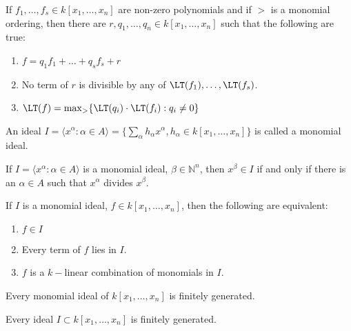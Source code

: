 \documentclass[crop=false,class=article,oneside]{standalone}
\begin{document}
        \begin{theorem}
            If $f_1,\hdots, f_s\in k[x_1,\hdots ,x_n]$ are
            non-zero polynomials and if $>$ is a monomial ordering,
            then there are $r,q_1,\hdots, q_n\in k[x_1,\hdots ,x_n]$
            such that the following are true:
            \begin{enumerate}
                \item $f=q_{1}f_{1}+\hdots+q_{s}f_{s}+r$
                \item No term of $r$ is divisible by
                      any of $\LT(f_{1}),\hdots,\LT(f_{s})$.
                \item $\LT(f)=\max_{>}\{\LT(q_{i})%
                       \cdot\LT(f_i):q_i\ne{0}\}$
            \end{enumerate}
        \end{theorem}
        \begin{definition}
            An ideal
            $I=\langle{x}^{\alpha}:\alpha\in{A}\rangle%
              =\{\sum_{\alpha}h_{\alpha}x^\alpha,h_{\alpha}%
               \in k[x_1,\hdots ,x_n]\}$
            is called a monomial ideal.
        \end{definition}
        \begin{theorem}
            If $I=\langle{x}^\alpha:\alpha\in{A}\rangle$
            is a monomial ideal,
            $\beta\in\mathbb{N}^n$, then $x^\beta\in{I}$
            if and only if there is an $\alpha\in{A}$
            such that $x^{\alpha}$ divides $x^{\beta}$.
        \end{theorem}
        \begin{theorem}
            If $I$ is a monomial ideal,
            $f\in{k}[x_1,\hdots ,x_n]$,
            then the following are equivalent:
            \begin{enumerate}
                \item $f\in I$
                \item Every term of $f$ lies in $I$.
                \item $f$ is a $k-$linear combination of
                      monomials in $I$.
            \end{enumerate}
        \end{theorem}
        \begin{theorem}
            Every monomial ideal of $k[x_{1},\hdots,x_{n}]$
            is finitely generated.
        \end{theorem}
        \begin{theorem}
            Every ideal $I\subset{k}[x_{1},\hdots,x_{n}]$
            is finitely generated.
        \end{theorem}
\end{document}
